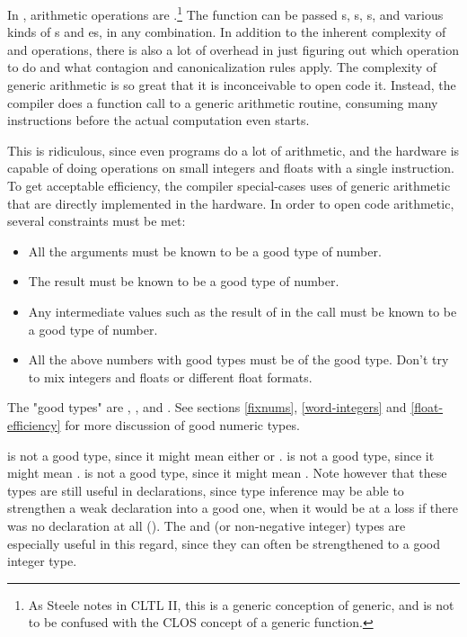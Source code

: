 {In \clisp, arithmetic operations are .\footnote{As Steele notes in CLTL
II, this is a generic conception of generic, and is not to be confused with the
CLOS concept of a generic function.}  The \code{+} function can be passed
s, s, s, and various kinds of s and
es, in any combination.  In addition to the inherent complexity of
 and  operations, there is also a lot of overhead in just
figuring out which operation to do and what contagion and canonicalization
rules apply.  The complexity of generic arithmetic is so great that it is
inconceivable to open code it.  Instead, the compiler does a function call to a
generic arithmetic routine, consuming many instructions before the actual
computation even starts.

This is ridiculous, since even \llisp{} programs do a lot of arithmetic, and the
hardware is capable of doing operations on small integers and floats with a
single instruction.  To get acceptable efficiency, the compiler special-cases
uses of generic arithmetic that are directly implemented in the hardware.  In
order to open code arithmetic, several constraints must be met:
\begin{itemize}

\item
All the arguments must be known to be a good type of number.

\item
The result must be known to be a good type of number.

\item
Any intermediate values such as the result of  in the call
 must be known to be a good type of number.

\item
All the above numbers with good types must be of the  good type.  Don't
try to mix integers and floats or different float formats.
\end{itemize}

The "good types" are , ,
 and .  See sections \ref{fixnums},
\ref{word-integers} and \ref{float-efficiency} for more discussion of good
numeric types.

 is not a good type, since it might mean either  or
.   is not a good type, since it might mean
.   is not a good type, since it might mean .
Note however that these types are still useful in declarations, since
type inference may be able to strengthen a weak declaration into a good one,
when it would be at a loss if there was no declaration at all ().  The  and  (or non-negative
integer) types are especially useful in this regard, since they can often be
strengthened to a good integer type.

}

